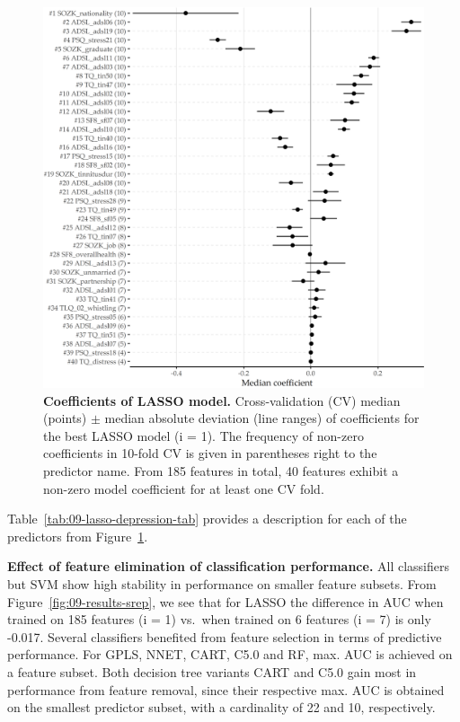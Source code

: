 \documentclass[
  oneside]{book}
\begin{document}
\begin{figure}

{\centering \includegraphics[width=0.5\linewidth]{figures/09-lasso-depression} 

}

\caption{\textbf{Coefficients of LASSO model.} Cross-validation (CV) median (points) \(\pm\) median absolute deviation (line ranges) of coefficients for the best LASSO model (i = 1). The frequency of non-zero coefficients in 10-fold CV is given in parentheses right to the predictor name. From 185 features in total, 40 features exhibit a non-zero model coefficient for at least one CV fold.}\label{fig:09-lasso-depression}
\end{figure}

Table~\ref{tab:09-lasso-depression-tab} provides a description for each of the predictors from Figure~\ref{fig:09-lasso-depression}.

\textbf{Effect of feature elimination of classification performance.} All classifiers but SVM show high stability in performance on smaller feature subsets.
From Figure~\ref{fig:09-results-srep}, we see that for LASSO the difference in AUC when trained on 185 features (i = 1) vs.~when trained on 6 features (i = 7) is only -0.017.
Several classifiers benefited from feature selection in terms of predictive performance.
For GPLS, NNET, CART, C5.0 and RF, max. AUC is achieved on a feature subset.
Both decision tree variants CART and C5.0 gain most in performance from feature removal, since their respective max. AUC is obtained on the smallest predictor subset, with a cardinality of 22 and 10, respectively.
\end{document}
